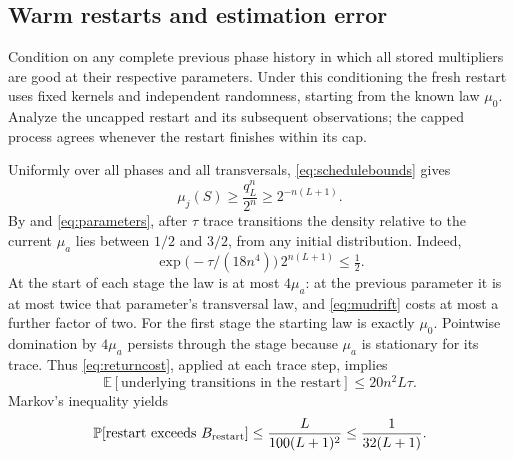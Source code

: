 \documentclass[11pt]{article}
\theoremstyle{definition}
\newcommand{\E}{\mathbb E}
\newcommand{\Prob}{\mathbb P}
\begin{document}
\subsection{Warm restarts and estimation error}

Condition on any complete previous phase history in which all stored
multipliers are good at their respective parameters.  Under this
conditioning the fresh restart uses fixed kernels and independent
randomness, starting from the known law $\mu_0$.  Analyze the uncapped
restart and its subsequent observations; the capped process agrees
whenever the restart finishes within its cap.

Uniformly over all phases and all transversals, \eqref{eq:schedulebounds}
gives
\begin{equation}\label{eq:minmu}
 \mu_j(S)\ge\frac{q_L^n}{2^n}\ge2^{-n(L+1)}.
\end{equation}
By  and \eqref{eq:parameters}, after $\tau$ trace
transitions the density relative to the current $\mu_a$ lies between
$1/2$ and $3/2$, from any initial distribution.  Indeed,
\[
 \exp\bigl(-\tau/(18n^4)\bigr)\,2^{n(L+1)}\le\tfrac12.
\]
At the start of each stage the law is at most $4\mu_a$: at the previous
parameter it is at most twice that parameter's transversal law, and
\eqref{eq:mudrift} costs at most a further factor of two.  For the
first stage the starting law is exactly $\mu_0$.  Pointwise domination
by $4\mu_a$ persists through the stage because $\mu_a$ is stationary
for its trace.  Thus \eqref{eq:returncost}, applied at each trace step,
implies
\begin{equation}\label{eq:restartmean}
 \E[\text{underlying transitions in the restart}]
 \le20n^2L\tau.
\end{equation}
Markov's inequality yields
\begin{equation}\label{eq:restartfailure}
 \Prob[\text{restart exceeds }B_{\rm restart}]
 \le\frac{L}{100(L+1)^2}\le\frac1{32(L+1)}.
\end{equation}
\end{document}
